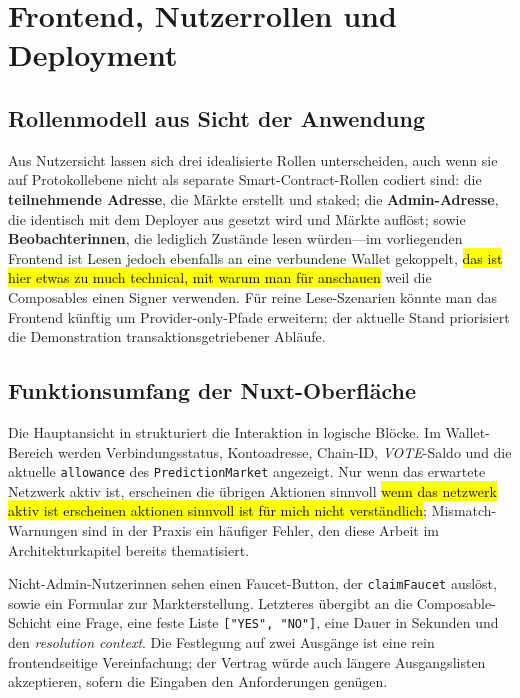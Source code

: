 \chapter{Frontend, Nutzerrollen und Deployment}
\label{chap:frontend}

\section{Rollenmodell aus Sicht der Anwendung}

Aus Nutzersicht lassen sich drei idealisierte Rollen unterscheiden, auch wenn
sie auf Protokollebene nicht als separate Smart-Contract-Rollen codiert sind:
die \textbf{teilnehmende Adresse}, die Märkte erstellt und staked; die
\textbf{Admin-Adresse}, die identisch mit dem Deployer aus 
gesetzt wird und Märkte auflöst; sowie \textbf{Beobachterinnen}, die lediglich
Zustände lesen würden---im vorliegenden Frontend ist Lesen jedoch ebenfalls an
eine verbundene Wallet gekoppelt, \hl{das ist hier etwas zu much technical, mit warum man für anschauen } weil die Composables einen Signer verwenden.
Für reine Lese-Szenarien könnte man das Frontend künftig um Provider-only-Pfade
erweitern; der aktuelle Stand priorisiert die Demonstration transaktionsgetriebener
Abläufe.

\section{Funktionsumfang der Nuxt-Oberfläche}

Die Hauptansicht in  strukturiert die Interaktion in
logische Blöcke. Im Wallet-Bereich werden Verbindungsstatus, Kontoadresse,
Chain-ID, \emph{VOTE}-Saldo und die aktuelle \texttt{allowance} des
\texttt{PredictionMarket} angezeigt. Nur wenn das erwartete Netzwerk aktiv ist,
erscheinen die übrigen Aktionen sinnvoll \hl{wenn das netzwerk aktiv ist erscheinen aktionen sinnvoll ist für mich nicht verständlich}; Mismatch-Warnungen sind in der Praxis
ein häufiger Fehler, den diese Arbeit im Architekturkapitel bereits thematisiert.

Nicht-Admin-Nutzerinnen sehen einen Faucet-Button, der \texttt{claimFaucet}
auslöst, sowie ein Formular zur Markterstellung. Letzteres übergibt an die
Composable-Schicht eine Frage, eine feste Liste \texttt{["YES", "NO"]}, eine
Dauer in Sekunden und den \emph{resolution context}. Die Festlegung auf zwei
Ausgänge ist eine rein frontendseitige Vereinfachung; der Vertrag würde auch
längere Ausgangslisten akzeptieren, sofern die Eingaben den Anforderungen genügen.

